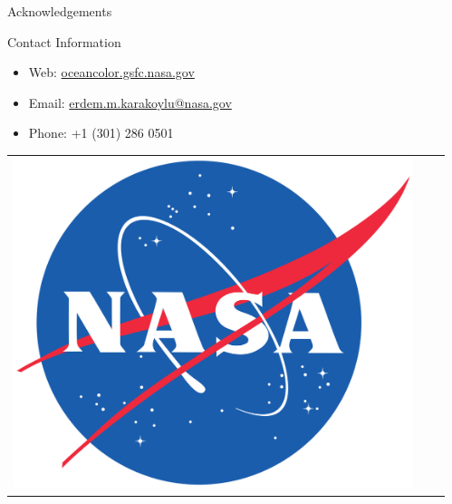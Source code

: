 \documentclass[final]{beamer}
\newlength{\sepwid}
\newlength{\onecolwid}
\begin{document}
\begin{frame}[t]
\begin{columns}[t]
\begin{column}{\onecolwid}
\begin{block}{Acknowledgements}
\end{block}



\begin{alertblock}{Contact Information}

\begin{itemize}
\item Web: \href{oceancolor.gsfc.nasa.gov}{oceancolor.gsfc.nasa.gov}
\item Email: \href{mailto:erdem.m.karakoylu@nasa.gov}{erdem.m.karakoylu@nasa.gov}
\item Phone: +1 (301) 286 0501
\end{itemize}

\end{alertblock}

\begin{center}
\begin{tabular}{ccc}
\includegraphics[width=0.4\linewidth]{NASA_logo.png} & \hfill 
\end{tabular}
\end{center}


\end{column} %
\begin{column}{\sepwid}\end{column} %
\end{columns} %

\end{frame} %
\end{document}
